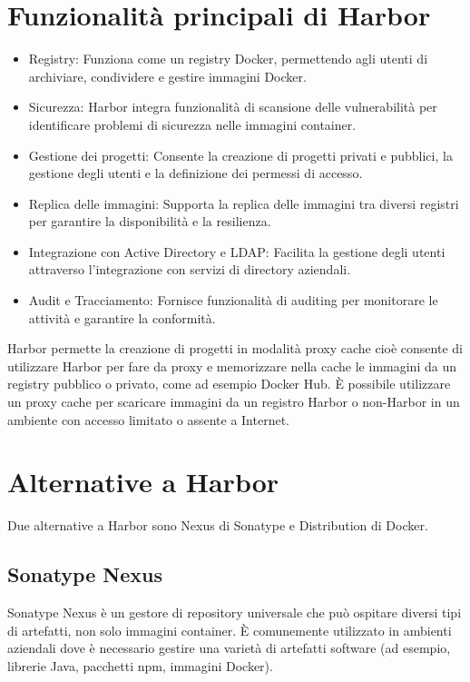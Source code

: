 \documentclass[12pt]{report}
\begin{document}
\section{Funzionalità principali di Harbor}
\begin{itemize}
    \item Registry: Funziona come un registry Docker, permettendo agli utenti di archiviare, condividere e gestire immagini Docker.
    \item Sicurezza: Harbor integra funzionalità di scansione delle vulnerabilità per identificare problemi di sicurezza nelle immagini container.
    \item Gestione dei progetti: Consente la creazione di progetti privati e pubblici, la gestione degli utenti e la definizione dei permessi di accesso.
    \item Replica delle immagini: Supporta la replica delle immagini tra diversi registri per garantire la disponibilità e la resilienza.
    \item Integrazione con Active Directory e LDAP: Facilita la gestione degli utenti attraverso l'integrazione con servizi di directory aziendali.
    \item Audit e Tracciamento: Fornisce funzionalità di auditing per monitorare le attività e garantire la conformità.
\end{itemize}
Harbor permette la creazione di progetti in modalità proxy cache cioè consente di utilizzare Harbor per fare da proxy e memorizzare nella cache le immagini da un registry pubblico o privato, come ad esempio Docker Hub. È possibile utilizzare un proxy cache per scaricare immagini da un registro Harbor o non-Harbor in un ambiente con accesso limitato o assente a Internet.
\section{Alternative a Harbor}
Due alternative a Harbor sono Nexus di Sonatype e Distribution di Docker.
\subsection{Sonatype Nexus}
Sonatype Nexus è un gestore di repository universale che può ospitare diversi tipi di artefatti, non solo immagini container. È comunemente utilizzato in ambienti aziendali dove è necessario gestire una varietà di artefatti software (ad esempio, librerie Java, pacchetti npm, immagini Docker).
\end{document}
